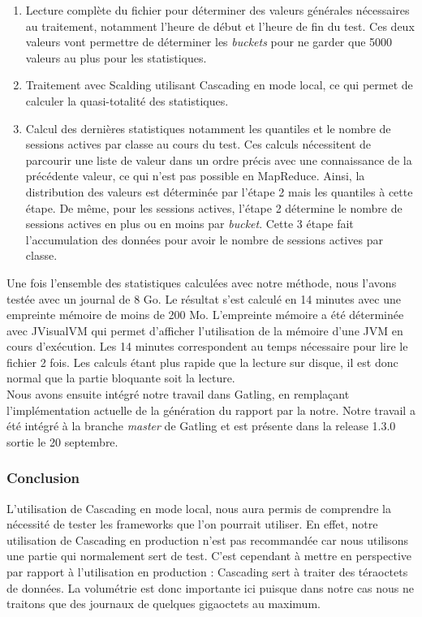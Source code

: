 \begin{enumerate}
 \item Lecture complète du fichier pour déterminer des valeurs générales nécessaires au traitement, notamment l'heure de début et l'heure de fin du test. Ces deux valeurs vont permettre de déterminer les \textit{buckets} pour ne garder que 5000 valeurs au plus pour les statistiques.
 \item Traitement avec Scalding utilisant Cascading en mode local, ce qui permet de calculer la quasi-totalité des statistiques.
 \item Calcul des dernières statistiques notamment les quantiles et le nombre de sessions actives par classe au cours du test. Ces calculs nécessitent de parcourir une liste de valeur dans un ordre précis avec une connaissance de la précédente valeur, ce qui n'est pas possible en MapReduce. Ainsi, la distribution des valeurs est déterminée par l'étape 2 mais les quantiles à cette étape. De même, pour les sessions actives, l'étape 2 détermine le nombre de sessions actives en plus ou en moins par \textit{bucket}. Cette 3\ieme{} étape fait l'accumulation des données pour avoir le nombre de sessions actives par classe.\\
\end{enumerate}

Une fois l'ensemble des statistiques calculées avec notre méthode, nous l'avons testée avec un journal de 8 Go. Le résultat s'est calculé en 14 minutes avec une empreinte mémoire de moins de 200 Mo. L'empreinte mémoire a été déterminée avec JVisualVM qui permet d'afficher l'utilisation de la mémoire d'une JVM en cours d'exécution. Les 14 minutes correspondent au temps nécessaire pour lire le fichier 2 fois. Les calculs étant plus rapide que la lecture sur disque, il est donc normal que la partie bloquante soit la lecture.\\

Nous avons ensuite intégré notre travail dans Gatling, en remplaçant l'implémentation actuelle de la génération du rapport par la notre. Notre travail a été intégré à la branche \textit{master} de Gatling et est présente dans la release 1.3.0 sortie le 20 septembre.

\subsubsection{Conclusion}

L'utilisation de Cascading en mode local, nous aura permis de comprendre la nécessité de tester les frameworks que l'on pourrait utiliser. En effet, notre utilisation de Cascading en production n'est pas recommandée car nous utilisons une partie qui normalement sert de test. C'est cependant à mettre en perspective par rapport à l'utilisation en production : Cascading sert à traiter des téraoctets de données. La volumétrie est donc importante ici puisque dans notre cas nous ne traitons que des journaux de quelques gigaoctets au maximum.\\


